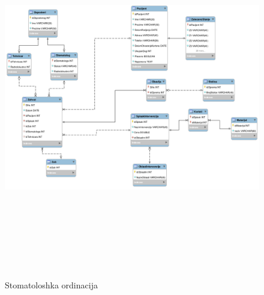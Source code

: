 \documentclass[10 pt]{article}
\begin{document}
\begin{figure}[H]
	\centering
	\includegraphics[width=15cm,height=15cm,keepaspectratio]{StomatoloskaOrdinacija.png}\\
	\caption{Stomatoloshka ordinacija \label{fig:dijagram}}
\end{figure}
\end{document}
